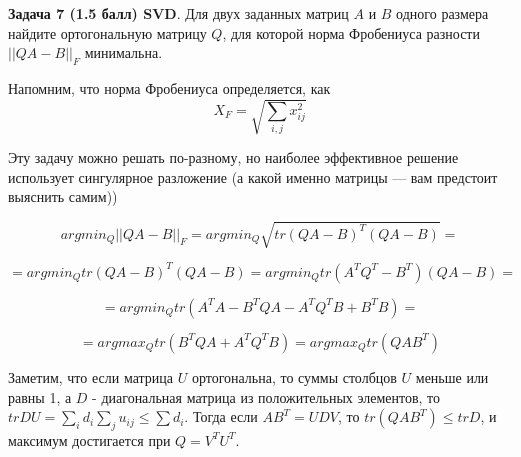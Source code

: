\documentclass[a4paper]{article}
\begin{document}
\bigskip



\textbf{Задача 7 (1.5 балл) SVD}.
Для двух заданных матриц $A$ и $B$ одного размера найдите ортогональную матрицу $Q$, для которой норма Фробениуса разности $||QA - B||_F$ минимальна.

Напомним, что норма Фробениуса определяется, как
$$X_F = \sqrt{\sum_{i,j}x_{ij}^2}$$

Эту задачу можно решать по-разному, но наиболее эффективное решение использует сингулярное разложение (а какой именно матрицы — вам предстоит выяснить самим))

$$argmin_Q ||QA - B||_F = argmin_Q \sqrt{tr(QA -B)^T(QA-B)} = $$ 

$$ = argmin_Q tr(QA -B)^T(QA-B) = argmin_Q tr(A^TQ^T -B^T )(QA-B) = $$

$$=argmin_Q tr(A^TA - B^TQA -A^TQ^TB +B^TB)=$$

$$= argmax_Q tr(B^TQA +A^TQ^TB)=argmax_Q tr(QAB^T)$$

Заметим, что если матрица $U$ ортогональна, то суммы столбцов $U$ меньше или равны 1, а $D$ - диагональная матрица из положительных элементов, то $trDU = \sum_i d_i \sum_j u_{ij} \leq \sum d_i$. Тогда если $AB^T = UDV$, то $tr(QAB^T) \leq trD$, и максимум достигается при $Q = V^TU^T$.
\end{document}
